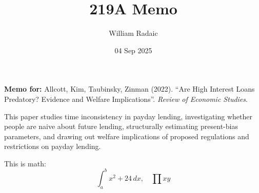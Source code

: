 \documentclass[english,11pt]{wr-memo}
\title{219A Memo}
\author{William Radaic}
\date{04 Sep 2025}
\begin{document}
\maketitle


\textbf{Memo for:} Allcott, Kim, Taubinsky, Zinman (2022). “Are High Interest Loans Predatory? Evidence and Welfare Implications”. \textit{Review of Economic Studies}.

\medskip 


This paper studies time inconsistency in payday lending, investigating whether people are naive about future lending, structurally estimating present-bias parameters, and drawing out welfare implications of proposed regulations and restrictions on payday lending.

This is math: 
\begin{equation}
    \int_{a}^{b} x^2 + 24  \,dx, \quad \prod xy 
\end{equation}



\clearpage 
\printbibliography[title={References}]
\end{document}
